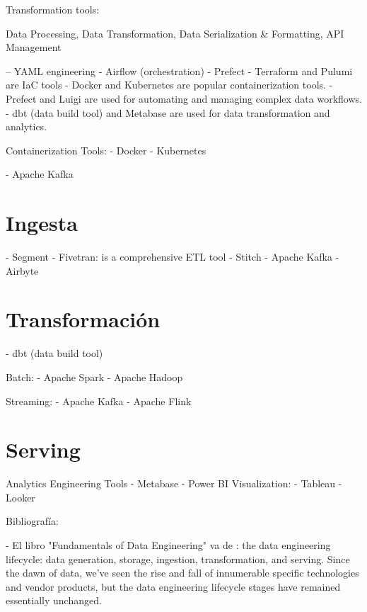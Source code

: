 \documentclass[12pt]{book}
\begin{document}
Transformation tools:


Data Processing, Data Transformation, Data Serialization & Formatting, API Management

--  YAML engineering 
- Airflow (orchestration)
- Prefect
- Terraform and Pulumi are IaC tools
- Docker and Kubernetes are popular containerization tools.
- Prefect and Luigi are used for automating and managing complex data workflows.
- dbt (data build tool) and Metabase are used for data transformation and analytics.


Containerization Tools:
- Docker
- Kubernetes


- Apache Kafka


\section{Ingesta}
- Segment
- Fivetran: is a comprehensive ETL tool
- Stitch
- Apache Kafka
- Airbyte 
\section{Transformación}

- dbt (data build tool)

Batch:
- Apache Spark
- Apache Hadoop

Streaming:
- Apache Kafka
- Apache Flink

\section{Serving}
Analytics Engineering Tools
- Metabase
- Power BI
Visualization:
- Tableau
- Looker


Bibliografía: 

- El libro "Fundamentals of Data Engineering" va de : the data engineering lifecycle: data generation, storage, ingestion, transformation, and serving. Since the dawn of data, we've seen the rise and fall of innumerable specific technologies and vendor products, but the data engineering lifecycle stages have remained essentially unchanged. 
\end{document}
